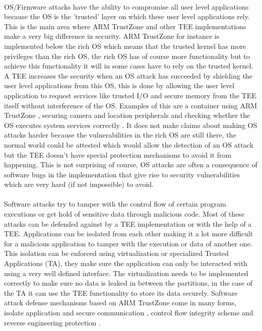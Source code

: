 \documentclass{report}
\begin{document}
\paragraph*{}
OS/Firmware attacks have the ability to compromise all user level applications because the OS is the 'trusted' layer on which these user level applications rely. This is the main area where ARM TrustZone and other TEE implementations make a very big difference in security. ARM TrustZone for instance is implemented below the rich OS which means that the trusted kernel has more privileges than the rich OS, the rich OS has of course more functionality but to achieve this functionality it will in some cases have to rely on the trusted kernel. A TEE increases the security when an OS attack has succeeded by shielding the user level applications from this OS, this is done by allowing the user level application to request services like trusted I/O and secure memory from the TEE itself without interference of the OS. Examples of this are a container using ARM TrustZone \cite{HuaZhichao2021Tpcf}, securing camera and location peripherals \cite{SalmanAmmarS2021SMSG} and checking whether the OS executes system services correctly \cite{GuanLe2017TSEo}. It does not make claims about making OS attacks harder because the vulnerabilities in the rich OS are still there, the normal world could be attested which would allow the detection of an OS attack but the TEE doesn't have special protection mechanisms to avoid it from happening. This is not surprising of course, OS attacks are often a consequence of software bugs in the implementation that give rise to security vulnerabilities which are very hard (if not impossible) to avoid.

\paragraph*{}
Software attacks try to tamper with the control flow of certain program executions or get hold of sensitive data through malicious code. Most of these attacks can be defended against by a TEE implementation or with the help of a TEE. Applications can be isolated from each other making it a lot more difficult for a malicious application to tamper with the execution or data of another one. This isolation can be enforced using virtualization or specialized Trusted Applications (TA), they make sure the application can only be interacted with using a very well defined interface. The virtualization needs to be implemented correctly to make sure no data is leaked in between the partitions, in the case of the TA it can use the TEE functionality to store its data securely. Software attack defense mechanisms based on ARM TrustZone come in many forms, isolate application and secure communication \cite{ZhangDiming2020iIfs}, control flow integrity scheme \cite{KawadaTomoaki2020TRCI} and reverse engineering protection \cite{BenYehudaRaz2019Pare}.
\end{document}
